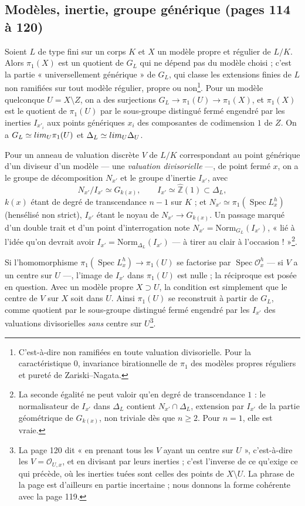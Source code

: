 \documentclass[11pt,a4paper]{article}
\begin{document}
\subsection*{Modèles, inertie, groupe générique (pages 114 à 120)}

Soient $L$ de type fini sur un corps $K$ et $X$ un modèle propre et régulier de
$L/K$. Alors $\pi_1(X)$ est un quotient de $G_L$ qui ne dépend pas du modèle
choisi ; c'est la partie « universellement générique » de $G_L$, qui classe les
extensions finies de $L$ non ramifiées sur tout modèle régulier, propre ou
non\footnote{C'est-à-dire non ramifiées en toute valuation divisorielle. Pour
la caractéristique $0$, invariance birationnelle de $\pi_1$ des modèles propres
réguliers et pureté de Zariski–Nagata.}. Pour un modèle quelconque $U = X
\setminus Z$, on a des surjections $G_L \to \pi_1(U) \to \pi_1(X)$, et
$\pi_1(X)$ est le quotient de $\pi_1(U)$ par le sous-groupe distingué fermé
engendré par les inerties $I_{x'_i}$ aux points génériques $x_i$ des
composantes de codimension $1$ de $Z$. On a $G_L \simeq \varprojlim_U \pi_1(U)$
et $\Delta_L \simeq \varprojlim_U \Delta_U$.

Pour un anneau de valuation discrète $V$ de $L/K$ correspondant au point
générique d'un diviseur d'un modèle — une \emph{valuation divisorielle} —, de
point fermé $x$, on a le groupe de décomposition $N_{x'}$ et le groupe
d'inertie $I_{x'}$, avec
\[
N_{x'}/I_{x'} \simeq G_{k(x)}, \qquad I_{x'} \simeq \widehat{\mathbb{Z}}(1)
\subset \Delta_L ,
\]
$k(x)$ étant de degré de transcendance $n - 1$ sur $K$ ; et $N_{x'} \simeq
\pi_1(\operatorname{Spec} L^h_x)$ (hensélisé non strict), $I_{x'}$ étant le
noyau de $N_{x'} \to G_{k(x)}$. Un passage marqué d'un double trait et d'un
point d'interrogation note $N_{x'} = \mathrm{Norm}_{G_L}(I_{x'})$, « lié à
l'idée qu'on devrait avoir $I_{x'} = \mathrm{Norm}_{\Delta_L}(I_{x'})$ — à tirer
au clair à l'occasion ! »\footnote{La seconde égalité ne peut valoir qu'en
degré de transcendance $1$ : le normalisateur de $I_{x'}$ dans $\Delta_L$
contient $N_{x'} \cap \Delta_L$, extension par $I_{x'}$ de la partie
géométrique de $G_{k(x)}$, non triviale dès que $n \ge 2$. Pour $n = 1$, elle
est vraie.}.

Si l'homomorphisme $\pi_1(\operatorname{Spec} L^h_x) \to \pi_1(U)$ se
factorise par $\operatorname{Spec} \mathcal{O}^h_x$ — si $V$ a un centre sur
$U$ —, l'image de $I_{x'}$ dans $\pi_1(U)$ est nulle ; la réciproque est
posée en question. Avec un modèle propre $X \supset U$, la condition est
simplement que le centre de $V$ sur $X$ soit dans $U$. Ainsi $\pi_1(U)$ se
reconstruit à partir de $G_L$, comme quotient par le sous-groupe distingué
fermé engendré par les $I_{x'}$ des valuations divisorielles \emph{sans}
centre sur $U$\footnote{La page 120 dit « en prenant tous les $V$ ayant un
centre sur $U$ », c'est-à-dire les $V = \mathcal{O}_{U,x}$, et en divisant par
leurs inerties ; c'est l'inverse de ce qu'exige ce qui précède, où les
inerties tuées sont celles des points de $X \setminus U$. La phrase de la page
est d'ailleurs en partie incertaine ; nous donnons la forme cohérente avec la
page 119.}.
\end{document}
